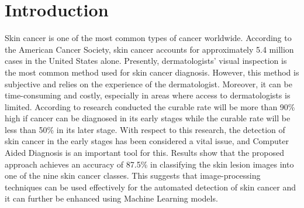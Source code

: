 \documentclass[twocolumn]{article}
\begin{document}
\section{Introduction}
Skin cancer is one of the most common types of cancer worldwide. According to the American Cancer Society, skin cancer accounts for approximately 5.4 million cases in the United States alone. Presently, dermatologists' visual inspection is the most common method used for skin cancer diagnosis. However, this method is subjective and relies on the experience of the dermatologist. Moreover, it can be time-consuming and costly, especially in areas where access to dermatologists is limited. According to research conducted the curable rate will be more than 90\% high if cancer can be diagnosed in its early stages while the curable rate will be less than 50\% in its later stage. With respect to this research, the detection of skin cancer in the early stages has been considered a vital issue, and Computer Aided Diagnosis is an important tool for this. Results show that the proposed approach achieves an accuracy of 87.5\% in classifying the skin lesion images into one of the nine skin cancer classes. This suggests that image-processing techniques can be used effectively for the automated detection of skin cancer and it can further be enhanced using Machine Learning models.
\end{document}

